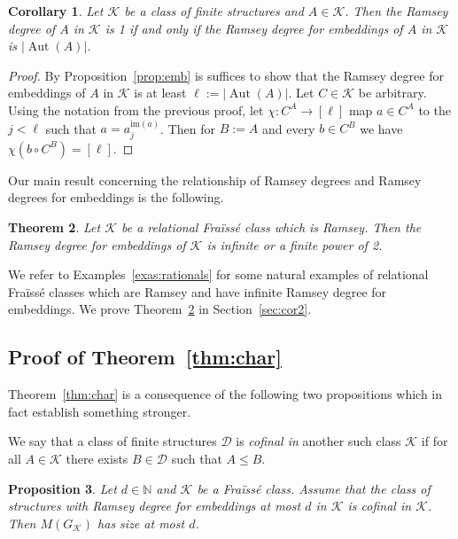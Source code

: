 \documentclass[12pt]{amsart}
\theoremstyle{plain}
\newtheorem{theorem}{Theorem}[section]
\newtheorem{proposition}[theorem]{Proposition}
\newtheorem{corollary}[theorem]{Corollary}
\theoremstyle{definition}
\begin{document}
\begin{corollary}\label{cor:emb2} Let ${\mathcal K}$ be a class of finite structures and $A\in {\mathcal K}$. Then
the Ramsey degree of $A$ in ${\mathcal K}$ is 1 if and only if the Ramsey degree for embeddings of $A$ in ${\mathcal K}$ is $|\operatorname{Aut}(A)|$. 
\end{corollary}

\begin{proof}
By Proposition~\ref{prop:emb} is suffices to show that the Ramsey degree for embeddings of $A$ in ${\mathcal K}$ is at least 
$\ell:=|\operatorname{Aut}(A)|$. Let $C\in {\mathcal K}$ be arbitrary. Using the notation from the previous proof, let $\chi:C^A\to[\ell]$ map 
$a\in C^A$ to the $j<\ell$ such that $a=a_j^{{\mathrm{im}}(a)}$. Then for $B:= A$ and 
every $b\in C^B$ we have $\chi(b\circ C^B)=[\ell]$.
\end{proof}

Our main result concerning the relationship of Ramsey degrees and Ramsey degrees for embeddings is the following.

\begin{theorem}\label{thm:mystery}
 Let ${\mathcal K}$ be a relational Fra\"iss\'e class which is Ramsey. Then the 
Ramsey degree for embeddings of ${\mathcal K}$ is infinite or a finite power of 2.
\end{theorem}

We refer to Examples~\ref{exas:rationals} for some natural 
examples of relational Fra\"iss\'e classes which are Ramsey and have infinite Ramsey degree for embeddings.
We prove Theorem~\ref{thm:mystery} in Section~\ref{sec:cor2}.

\subsection{Proof of Theorem~\ref{thm:char}} \label{sec:proof}
Theorem~\ref{thm:char} is a consequence of the following 
two propositions which in fact establish something stronger.

We say that a class of finite structures $\mathcal D$ is {\em cofinal in} another 
such class ${\mathcal K}$ if for all $A\in{\mathcal K}$ there exists $B\in\mathcal D$ such that $A\le B$.

\begin{proposition}\label{prop:ramtoam} Let $d\in{\mathbb N}$ and ${\mathcal K}$ be a Fra\"iss\'e class.
Assume that the class of structures with Ramsey degree  for embeddings  at most $d$ in ${\mathcal K}$ is cofinal in ${\mathcal K}$.
Then $M(G_{\mathcal K})$ has size at most $d$.
\end{proposition}
\end{document}
